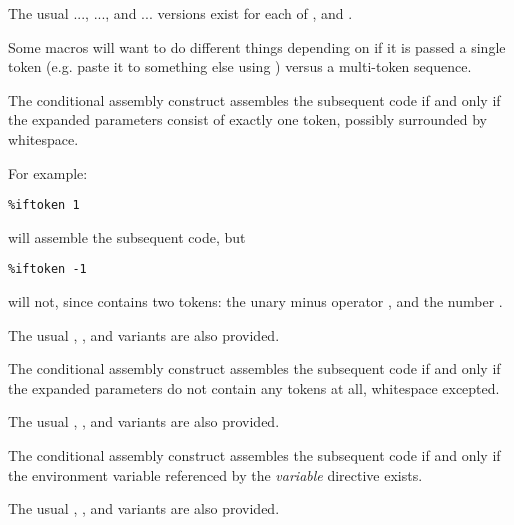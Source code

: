 The usual ...,
..., and
...
versions exist for each of ,  and .


Some macros will want to do different things depending on if it is
passed a single token (e.g. paste it to something else using \code{\%+})
versus a multi-token sequence.

The conditional assembly construct  assembles the
subsequent code if and only if the expanded parameters consist of
exactly one token, possibly surrounded by whitespace.

For example:

\begin{lstlisting}
%iftoken 1
\end{lstlisting}

will assemble the subsequent code, but

\begin{lstlisting}
%iftoken -1
\end{lstlisting}

will not, since  contains two tokens: the unary minus operator
\code{-}, and the number .

The usual , , and
 variants are also provided.


The conditional assembly construct  assembles the
subsequent code if and only if the expanded parameters do not contain
any tokens at all, whitespace excepted.

The usual , , and
 variants are also provided.


The conditional assembly construct  assembles the
subsequent code if and only if the environment variable referenced by
the \emph{variable} directive exists.

The usual , , and 
variants are also provided.

